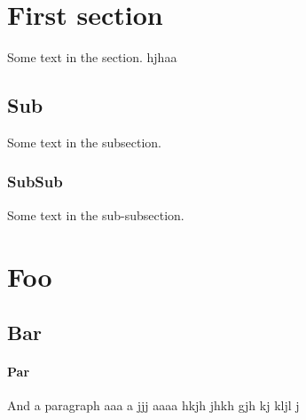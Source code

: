 \documentclass{article}
\begin{document}
\section {First section}

Some text in the section.    hjhaa
 
\subsection {Sub}
  
Some text in the subsection.

\subsubsection {SubSub} 

Some text in the sub-subsection. 


\section{Foo}

\subsection {Bar}

\paragraph {Par}

And a paragraph aaa a jjj  
aaaa hkjh jhkh gjh  kj kljl j
\end{document}
